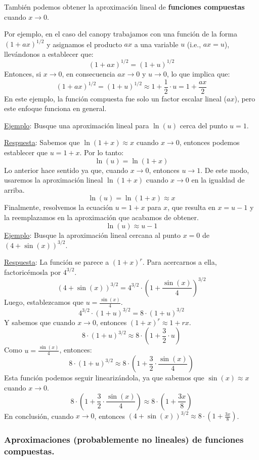\documentclass[12pt]{article}
\begin{document}
También podemos obtener la aproximación lineal de \textbf{funciones compuestas} cuando $x \to 0$.

Por ejemplo, en el caso del canopy trabajamos con una función de la forma $(1 + ax)^{1/2}$ y asignamos el producto $ax$ a una variable $u$ (i.e., $ax = u$), llevándonos a establecer que:
\[(1 + ax)^{1/2} = (1 + u)^{1/2}\]
Entonces, si $x \to 0$, en consecuencia $ax \to 0$ y $u \to 0$, lo que implica que:
\[(1 + ax)^{1/2} = (1 + u)^{1/2} \approx 1 + \frac{1}{2} \cdot u = 1 + \frac{ax}{2}\]
En este ejemplo, la función compuesta fue solo un factor escalar lineal ($ax$), pero este enfoque funciona en general.

\underline{Ejemplo}: Busque una aproximación lineal para $\ln(u)$ cerca del punto $u = 1$.

\underline{Respuesta}: Sabemos que $\ln(1 + x) \approx x$ cuando $x\to 0$, entonces podemos establecer que $u = 1 + x$. Por lo tanto:
\[\ln(u) = \ln(1 + x)\]
Lo anterior hace sentido ya que, cuando $x \to 0$, entonces $u \to 1$. De este modo, usaremos la aproximación lineal $\ln(1 + x)$ cuando $x \to 0$ en la igualdad de arriba.
\[\ln(u) = \ln(1 + x) \approx x\]
Finalmente, resolvemos la ecuación $u = 1 + x$ para $x$, que resulta en $x = u - 1$ y la reemplazamos en la aproximación que acabamos de obtener.
\[\ln(u) \approx u - 1\]
\underline{Ejemplo}: Busque la aproximación lineal cercana al punto $x = 0$ de $(4 + \sin(x))^{3/2}$.

\underline{Respuesta}: La función se parece a $(1 + x)^{r}$. Para acercarnos a ella, factoricémosla por $4^{3/2}$.
\[(4 + \sin(x))^{3/2} = 4^{3/2} \cdot \left(1 + \frac{\sin(x)}{4}\right)^{3/2}\]
Luego, establezcamos que $u = \frac{\sin(x)}{4}$.
\[4^{3/2} \cdot (1 + u)^{3/2} = 8 \cdot (1 + u)^{3/2}\]
Y sabemos que cuando $x \to 0$, entonces $(1 + x)^{r} \approx 1 + rx$.
\[8 \cdot (1 + u)^{3/2} \approx 8 \cdot \left(1 + \frac{3}{2} \cdot u\right)\]
Como $u = \frac{\sin(x)}{4}$, entonces:
\[8 \cdot (1 + u)^{3/2} \approx 8 \cdot \left(1 + \frac{3}{2} \cdot \frac{\sin(x)}{4}\right)\]
Esta función podemos seguir linearizándola, ya que sabemos que $\sin(x) \approx x$ cuando $x \to 0$.
\[8 \cdot \left(1 + \frac{3}{2} \cdot \frac{\sin(x)}{4}\right) \approx 8 \cdot \left(1 + \frac{3x}{8}\right)\]
En conclusión, cuando $x \to 0$, entonces $(4 + \sin(x))^{3/2} \approx 8 \cdot \left(1 + \frac{3x}{8}\right)$.

\subsubsection{Aproximaciones (probablemente no lineales) de funciones compuestas.}
\end{document}
